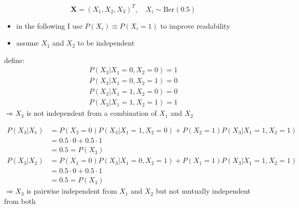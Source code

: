 \[ \mathbf{X} = \left( X_1, X_2, X_3 \right)^T, \quad X_i \sim \mathrm{Ber}(0.5) \]

\begin{itemize}
	\item in the following I use $P(X_i) \equiv P(X_i = 1)$ to improve readability
	\item assume $X_1$ and $X_2$ to be independent
\end{itemize}

define:
\begin{align*}
	P(X_3|X_1=0,X_2=0) = 1 \\
	P(X_3|X_1=0,X_2=1) = 0 \\
	P(X_3|X_1=1,X_2=0) = 0 \\
	P(X_3|X_1=1,X_2=1) = 1
\end{align*}
$\Rightarrow X_3$ is not independent from a combination of $X_1$ and $X_2$

\begin{align*}
	P(X_3|X_1) &= P(X_2=0) P(X_3|X_1=1,X_2=0) + P(X_2=1) P(X_3|X_1=1,X_2=1) \\
		   &= 0.5 \cdot 0 + 0.5 \cdot 1 \\
	    &= 0.5 = P(X_3) \\
	P(X_3|X_2) &= P(X_1=0) P(X_3|X_1=0,X_2=1) + P(X_1=1) P(X_3|X_1=1,X_2=1) \\
		   &= 0.5 \cdot 0 + 0.5 \cdot 1 \\
	    &= 0.5 = P(X_3)
\end{align*}
$\Rightarrow X_3$ is pairwise independent from $X_1$ and $X_2$ but not mutually independent from both

